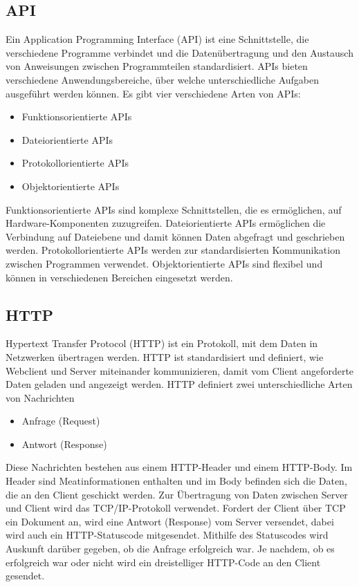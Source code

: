 \subsection{API}
Ein Application Programming Interface (API) ist eine Schnittstelle, die verschiedene Programme verbindet
und die Datenübertragung und den Austausch von Anweisungen zwischen Programmteilen standardisiert.
\newline
APIs bieten verschiedene Anwendungsbereiche, über welche unterschiedliche Aufgaben ausgeführt werden können.
\newline
Es gibt vier verschiedene Arten von APIs:
\begin{itemize}
  \item Funktionsorientierte APIs
  \item Dateiorientierte APIs
  \item Protokollorientierte APIs
  \item Objektorientierte APIs
\end{itemize}

Funktionsorientierte APIs sind komplexe Schnittstellen, die es ermöglichen, auf Hardware-Komponenten
zuzugreifen. Dateiorientierte APIs ermöglichen die Verbindung auf Dateiebene und damit können Daten
abgefragt und geschrieben werden. Protokollorientierte APIs werden zur standardisierten Kommunikation 
zwischen Programmen verwendet. Objektorientierte APIs sind flexibel und können in verschiedenen Bereichen 
eingesetzt werden.
~\cite{api}

\subsection{HTTP}
Hypertext Transfer Protocol (HTTP) ist ein Protokoll, mit dem Daten in Netzwerken übertragen werden. 
HTTP ist standardisiert und definiert, wie Webclient und Server miteinander kommunizieren, 
damit vom Client angeforderte Daten geladen und angezeigt werden.
\newline
\newline
HTTP definiert zwei unterschiedliche Arten von Nachrichten

\begin{itemize}
  \item Anfrage (Request)
  \item Antwort (Response)
\end{itemize}

Diese Nachrichten bestehen aus einem HTTP-Header und einem HTTP-Body. 
Im Header sind Meatinformationen enthalten und im Body befinden sich die Daten, 
die an den Client geschickt werden.
\newline
\newline
Zur Übertragung von Daten zwischen Server und Client wird das TCP/IP-Protokoll verwendet. 
Fordert der Client über TCP ein Dokument an, wird eine Antwort (Response) vom Server versendet,
dabei wird auch ein HTTP-Statuscode mitgesendet. Mithilfe des Statuscodes wird Auskunft darüber gegeben,
ob die Anfrage erfolgreich war. Je nachdem, ob es erfolgreich war oder nicht wird ein dreistelliger
HTTP-Code an den Client gesendet.
~\cite{http_ryte}

